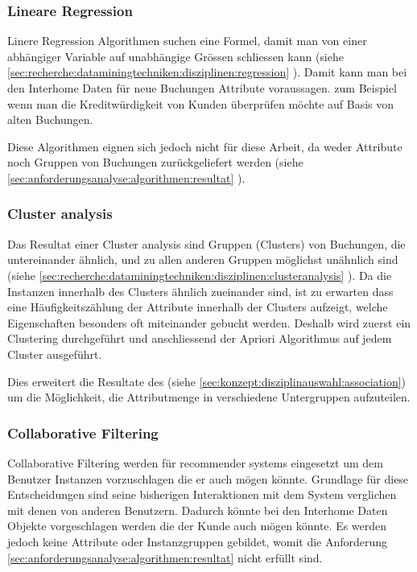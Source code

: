 \subsubsection{Lineare Regression}
\label{sec:konzept:disziplinauswahl:regression}
Linere Regression Algorithmen suchen eine Formel, damit man von einer abhängiger Variable auf unabhängige Grössen schliessen kann (siehe \cref{sec:recherche:dataminingtechniken:disziplinen:regression} ). Damit kann man bei den Interhome Daten für neue Buchungen Attribute voraussagen. zum Beispiel wenn man die Kreditwürdigkeit von Kunden überprüfen möchte auf Basis von alten Buchungen.

Diese Algorithmen eignen sich jedoch nicht für diese Arbeit, da weder Attribute noch Gruppen von Buchungen zurückgeliefert werden (siehe \cref{sec:anforderungsanalyse:algorithmen:resultat} ).

\subsubsection{Cluster analysis}
\label{sec:konzept:disziplinauswahl:clusteranalysis}
Das Resultat einer Cluster analysis sind Gruppen (Clusters) von Buchungen, die untereinander ähnlich, und zu allen anderen Gruppen möglichst unähnlich sind (siehe \cref{sec:recherche:dataminingtechniken:disziplinen:clusteranalysis} ). Da die Instanzen innerhalb des Clusters ähnlich zueinander sind, ist zu erwarten dass eine Häufigkeitszählung der Attribute innerhalb der Clusters aufzeigt, welche Eigenschaften besonders oft miteinander gebucht werden. Deshalb wird zuerst ein Clustering durchgeführt und anschliessend der Apriori Algorithmus auf jedem Cluster ausgeführt. 

Dies erweitert die Resultate des  (siehe \cref{sec:konzept:disziplinauswahl:association}) um die Möglichkeit, die Attributmenge in verschiedene Untergruppen aufzuteilen.

\subsubsection{Collaborative Filtering}
\label{sec:konzept:disziplinauswahl:collaborativefiltering}
Collaborative Filtering werden für recommender systems eingesetzt um dem Benutzer Instanzen vorzuschlagen die er auch mögen könnte. Grundlage für diese Entscheidungen sind seine bisherigen Interaktionen mit dem System verglichen mit denen von anderen Benutzern. Dadurch könnte bei den Interhome Daten Objekte vorgeschlagen werden die der Kunde auch mögen könnte. Es werden jedoch keine Attribute oder Instanzgruppen gebildet, womit die Anforderung \cref{sec:anforderungsanalyse:algorithmen:resultat} nicht erfüllt sind.


